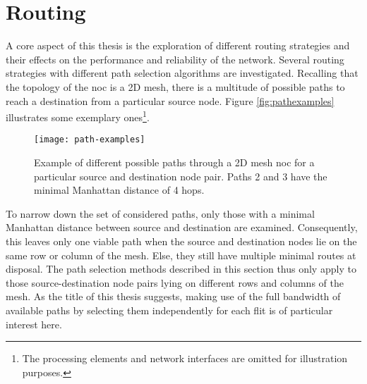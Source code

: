 \section{Routing}
A core aspect of this thesis is the exploration of different routing strategies and their effects on the performance and reliability of
the network. Several routing strategies with different path selection algorithms are investigated. Recalling that the topology of the
\gls{noc} is a 2D mesh, there is a multitude of possible paths to reach a destination from a particular source node. Figure \vref{fig:pathexamples}
illustrates some exemplary ones\footnote{The processing elements and network interfaces are omitted for illustration purposes.}.

\begin{figure}
    \centering
    \texttt{[image: path-examples]}
    \caption[Examples of different paths between two nodes]{Example of different possible paths through a 2D mesh \gls{noc} for a particular source
    and destination node pair. Paths 2 and 3 have the minimal Manhattan distance of 4 hops.}
    \label{fig:pathexamples}
\end{figure}

To narrow down the set of considered paths, only those with a minimal Manhattan distance between source and destination are examined. Consequently, this
leaves only one viable path when the source and destination nodes lie on the same row or column of the mesh. Else, they still have multiple minimal
routes at disposal. The path selection methods described in this section thus only apply to those source-destination node pairs lying on different
rows and columns of the mesh. As the title of this thesis suggests, making use of the full bandwidth of available paths by selecting them
independently for each flit is of particular interest here.

